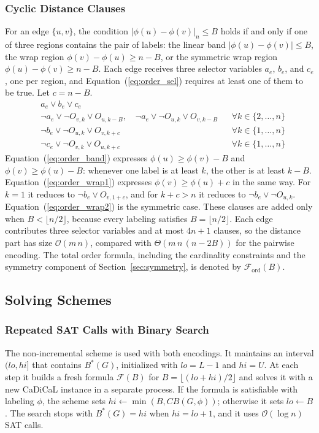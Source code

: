 \documentclass[a4paper,fleqn]{cas-sc}
\begin{document}
\subsubsection{Cyclic Distance Clauses}
For an edge $\{u,v\}$, the condition $|\phi(u)-\phi(v)|_n\le B$ holds if and only if one of three regions contains the pair of labels: the linear band $|\phi(u)-\phi(v)|\le B$, the wrap region $\phi(v)-\phi(u)\ge n-B$, or the symmetric wrap region $\phi(u)-\phi(v)\ge n-B$. Each edge receives three selector variables $a_e$, $b_e$, and $c_e$, one per region, and Equation~(\ref{eq:order_sel}) requires at least one of them to be true. Let $c=n-B$.
\begin{align}
    & a_e\lor b_e\lor c_e \label{eq:order_sel}\\
    & \neg a_e\lor\neg O_{v,k}\lor O_{u,k-B},\quad \neg a_e\lor\neg O_{u,k}\lor O_{v,k-B} && \forall k\in\{2,\dots,n\} \label{eq:order_band}\\
    & \neg b_e\lor\neg O_{u,k}\lor O_{v,k+c} && \forall k\in\{1,\dots,n\} \label{eq:order_wrap1}\\
    & \neg c_e\lor\neg O_{v,k}\lor O_{u,k+c} && \forall k\in\{1,\dots,n\} \label{eq:order_wrap2}
\end{align}
Equation~(\ref{eq:order_band}) expresses $\phi(u)\ge\phi(v)-B$ and $\phi(v)\ge\phi(u)-B$: whenever one label is at least $k$, the other is at least $k-B$. Equation~(\ref{eq:order_wrap1}) expresses $\phi(v)\ge\phi(u)+c$ in the same way. For $k=1$ it reduces to $\neg b_e\lor O_{v,1+c}$, and for $k+c>n$ it reduces to $\neg b_e\lor\neg O_{u,k}$. Equation~(\ref{eq:order_wrap2}) is the symmetric case. These clauses are added only when $B<\lfloor n/2\rfloor$, because every labeling satisfies $B=\lfloor n/2\rfloor$. Each edge contributes three selector variables and at most $4n+1$ clauses, so the distance part has size $\mathcal{O}(m\,n)$, compared with $\Theta(m\,n\,(n-2B))$ for the pairwise encoding. The total order formula, including the cardinality constraints and the symmetry component of Section~\ref{sec:symmetry}, is denoted by $\mathcal{F}_{\text{ord}}(B)$.

\subsection{Solving Schemes}
\label{sec:incremental}

\subsubsection{Repeated SAT Calls with Binary Search}
The non-incremental scheme is used with both encodings. It maintains an interval $(lo,hi]$ that contains $B^*(G)$, initialized with $lo=L-1$ and $hi=U$. At each step it builds a fresh formula $\mathcal{F}(B)$ for $B=\lfloor(lo+hi)/2\rfloor$ and solves it with a new CaDiCaL instance in a separate process. If the formula is satisfiable with labeling $\phi$, the scheme sets $hi\gets\min(B,CB(G,\phi))$; otherwise it sets $lo\gets B$. The search stops with $B^*(G)=hi$ when $hi=lo+1$, and it uses $\mathcal{O}(\log n)$ SAT calls.
\end{document}
